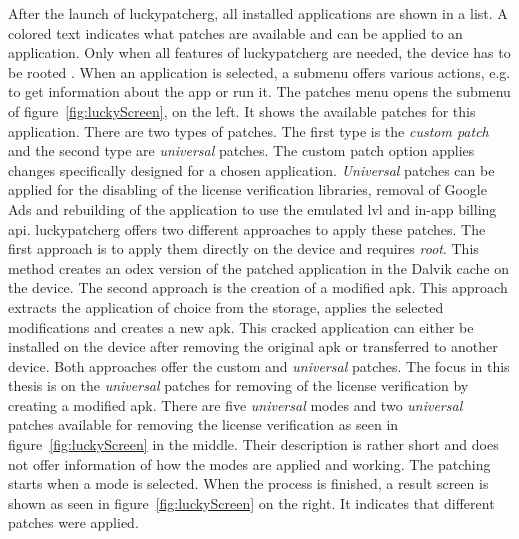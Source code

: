 After the launch of \gls{luckypatcherg}, all installed applications are shown in a list.
A colored text indicates what patches are available and can be applied to an application.
Only when all features of \gls{luckypatcherg} are needed, the device has to be rooted \cite{luckyPatcherOfficial}.
\newline
When an application is selected, a submenu offers various actions, e.g. to get information about the app or run it.
The patches menu opens the submenu of figure~\ref{fig:luckyScreen}, on the left.
It shows the available patches for this application.
\newline
There are two types of patches.
The first type is the \textit{custom patch} and the second type are \textit{universal} patches.
The custom patch option applies changes specifically designed for a chosen application.
\newline
\textit{Universal} patches can be applied for the disabling of the license verification libraries, removal of Google Ads and rebuilding of the application to use the emulated \gls{lvl} and in-app billing \gls{api}.
\newline
\gls{luckypatcherg} offers two different approaches to apply these patches.
The first approach is to apply them directly on the device and requires \textit{root}.
This method creates an \gls{odex} version of the patched application in the Dalvik cache on the device.
The second approach is the creation of a modified \gls{apk}.
This approach extracts the application of choice from the storage, applies the selected modifications and creates a new \gls{apk}.
This cracked application can either be installed on the device after removing the original \gls{apk} or transferred to another device.
\newline
Both approaches offer the custom and \textit{universal} patches.
\newline
\newline
The focus in this thesis is on the \textit{universal} patches for removing of the license verification by creating a modified \gls{apk}.
\newline
There are five \textit{universal} modes and two \textit{universal} patches available for removing the license verification as seen in figure~\ref{fig:luckyScreen} in the middle.
Their description is rather short and does not offer information of how the modes are applied and working.
\newline
The patching starts when a mode is selected.
When the process is finished, a result screen is shown as seen in figure~\ref{fig:luckyScreen} on the right.
It indicates that different patches were applied.
